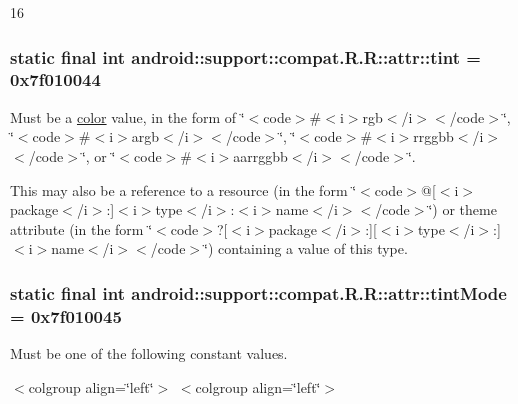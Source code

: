 16\hypertarget{classandroid_1_1support_1_1compat_1_1_r_1_1attr_3b1fdafdb6a9bced06c14b3379592790}{
\subsubsection[{tint}]{\setlength{\rightskip}{0pt plus 5cm}static final int android::support::compat.R.R::attr::tint = 0x7f010044}}
\label{classandroid_1_1support_1_1compat_1_1_r_1_1attr_3b1fdafdb6a9bced06c14b3379592790}


Must be a \hyperlink{classandroid_1_1support_1_1compat_1_1_r_1_1color}{color} value, in the form of \char`\"{}$<$code$>$\#$<$i$>$rgb$<$/i$>$$<$/code$>$\char`\"{}, \char`\"{}$<$code$>$\#$<$i$>$argb$<$/i$>$$<$/code$>$\char`\"{}, \char`\"{}$<$code$>$\#$<$i$>$rrggbb$<$/i$>$$<$/code$>$\char`\"{}, or \char`\"{}$<$code$>$\#$<$i$>$aarrggbb$<$/i$>$$<$/code$>$\char`\"{}. 

This may also be a reference to a resource (in the form \char`\"{}$<$code$>$@\mbox{[}$<$i$>$package$<$/i$>$:\mbox{]}$<$i$>$type$<$/i$>$:$<$i$>$name$<$/i$>$$<$/code$>$\char`\"{}) or theme attribute (in the form \char`\"{}$<$code$>$?\mbox{[}$<$i$>$package$<$/i$>$:\mbox{]}\mbox{[}$<$i$>$type$<$/i$>$:\mbox{]}$<$i$>$name$<$/i$>$$<$/code$>$\char`\"{}) containing a value of this type. \hypertarget{classandroid_1_1support_1_1compat_1_1_r_1_1attr_f452bf5e0168bf86753b37cf7a015ba2}{
\subsubsection[{tintMode}]{\setlength{\rightskip}{0pt plus 5cm}static final int android::support::compat.R.R::attr::tintMode = 0x7f010045}}
\label{classandroid_1_1support_1_1compat_1_1_r_1_1attr_f452bf5e0168bf86753b37cf7a015ba2}


Must be one of the following constant values. \begin{TabularC}{0}
\hline
\end{TabularC}
$<$colgroup align=\char`\"{}left\char`\"{}$>$ $<$colgroup align=\char`\"{}left\char`\"{}$>$ 

